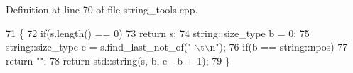Definition at line 70 of file string\+\_\+tools.\+cpp.


\begin{DoxyCode}
71 \{
72   \textcolor{keywordflow}{if}(s.length() == 0)
73     \textcolor{keywordflow}{return} s;
74   string::size\_type b = 0;
75   string::size\_type e = s.find\_last\_not\_of(\textcolor{stringliteral}{" \(\backslash\)t\(\backslash\)n"});
76   \textcolor{keywordflow}{if}(b == string::npos)
77     \textcolor{keywordflow}{return} \textcolor{stringliteral}{""};
78   \textcolor{keywordflow}{return} std::string(s, b, e - b + 1);
79 \}
\end{DoxyCode}
